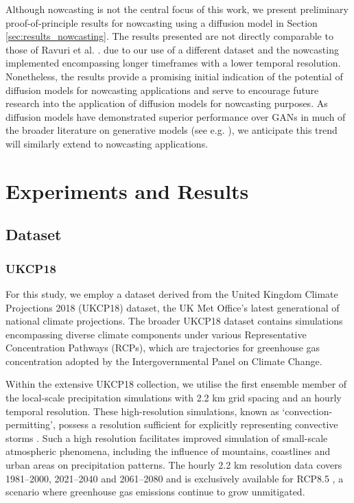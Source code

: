\documentclass[ oneside,%
                    author={George Herbert},
                    degree={MSci},
                     title={Diffusion Models for Time-Evolving Precipitation Fields},
                  subtitle={}]{dissertation}
\begin{document}
Although nowcasting is not the central focus of this work, we present preliminary proof-of-principle results for nowcasting using a diffusion model in Section \ref{sec:results_nowcasting}. The results presented are not directly comparable to those of Ravuri et al. \cite{Ravuri_Skillful_Precipitation_Nowcasting}. due to our use of a different dataset and the nowcasting implemented encompassing longer timeframes with a lower temporal resolution. Nonetheless, the results provide a promising initial indication of the potential of diffusion models for nowcasting applications and serve to encourage future research into the application of diffusion models for nowcasting purposes. As diffusion models have demonstrated superior performance over GANs in much of the broader literature on generative models (see e.g. \cite{DDPM_Ho, Cascaded_Ho, Imagen_Saharia}), we anticipate this trend will similarly extend to nowcasting applications.


\chapter{Experiments and Results}
\label{chap:results}

\section{Dataset}
\label{sec:results_dataset}

\subsection{UKCP18}
\label{sec:results_dataset_ukcp18}

For this study, we employ a dataset derived from the United Kingdom Climate Projections 2018 (UKCP18) \cite{MO_UKCP18_Dataset} dataset, the UK Met Office's latest generational of national climate projections. The broader UKCP18 dataset contains simulations encompassing diverse climate components under various Representative Concentration Pathways (RCPs), which are trajectories for greenhouse gas concentration adopted by the Intergovernmental Panel on Climate Change.

Within the extensive UKCP18 collection, we utilise the first ensemble member of the local-scale precipitation simulations with 2.2 km grid spacing and an hourly temporal resolution. These high-resolution simulations, known as `convection-permitting', possess a resolution sufficient for explicitly representing convective storms \cite{MO_CPM}. Such a high resolution facilitates improved simulation of small-scale atmospheric phenomena, including the influence of mountains, coastlines and urban areas on precipitation patterns. The hourly 2.2 km resolution data covers 1981--2000, 2021--2040 and 2061--2080 and is exclusively available for RCP8.5 \cite{MO_RCP_Guidance}, a scenario where greenhouse gas emissions continue to grow unmitigated.
\end{document}
